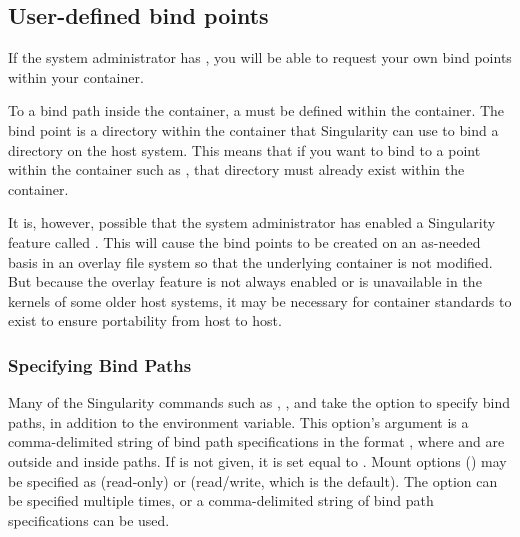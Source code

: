 \documentclass[letterpaper,10pt,english]{sphinxmanual}
\begin{document}
\subsection{User-defined bind points}
\label{\detokenize{bind_paths_and_mounts:user-defined-bind-points}}
If the system administrator has , you
will be able to request your own bind points within your container.

To  a bind path inside the container, a  must be
defined within the container. The bind point is a directory within the
container that Singularity can use to bind a directory on the host
system. This means that if you want to bind to a point within the
container such as , that directory must already exist within the
container.

It is, however, possible that the system administrator has enabled a
Singularity feature called . This will cause the bind points to be created on an as-needed
basis in an overlay file system so that the underlying container is
not modified. But because the overlay feature is not always enabled or
is unavailable in the kernels of some older host systems, it may be
necessary for container standards to exist to ensure portability from
host to host.


\subsubsection{Specifying Bind Paths}
\label{\detokenize{bind_paths_and_mounts:specifying-bind-paths}}
Many of the Singularity commands such as ,  , and  take the  option to specify bind paths, in addition to the 
environment variable. This option’s argument is a comma-delimited
string of bind path specifications in the format , where  and  are
outside and inside paths. If  is not given, it is set equal to  . Mount
options () may be specified as  (read-only) or  (read/write, which is
the default). The  option can be specified multiple times, or a
comma-delimited string of bind path specifications can be used.
\end{document}
